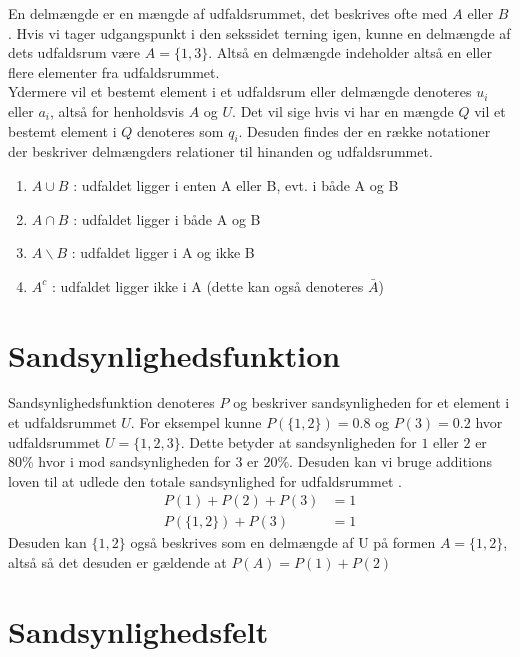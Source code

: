 \documentclass[../../SRP.tex]{subfiles}
\begin{document}
En delmængde er en mængde af udfaldsrummet, det beskrives ofte med $A$ eller $B$. Hvis vi tager udgangspunkt i den sekssidet terning igen, kunne en delmængde af dets udfaldsrum være $A = \{1,3\}$. Altså en delmængde indeholder altså en eller flere elementer fra udfaldsrummet. \\

Ydermere vil et bestemt element i et udfaldsrum eller delmængde denoteres $u_i$ eller $a_i$, altså for henholdsvis $A$ og $U$. Det vil sige hvis vi har en mængde $Q$ vil et bestemt element i $Q$ denoteres som $q_i$. Desuden findes der en række notationer der beskriver delmængders relationer til hinanden og udfaldsrummet.
\begin{enumerate}
  \item $A \cup B$ : udfaldet ligger i enten A eller B, evt. i både A og B
  \item $A \cap B$ : udfaldet ligger i både A og B
  \item $A \backslash B$ : udfaldet ligger i A og ikke B
  \item $A^c$ : udfaldet ligger ikke i A (dette kan også denoteres $\bar{A}$)
\end{enumerate}

\section{Sandsynlighedsfunktion}

Sandsynlighedsfunktion denoteres $P$ og beskriver sandsynligheden for et element i et udfaldsrummet $U$. For eksempel kunne $P(\{1,2\}) = 0.8$ og $P(3) = 0.2$ hvor udfaldsrummet $U = \{1,2,3\}$. Dette betyder at sandsynligheden for $1$ eller $2$ er $80\%$ hvor i mod sandsynligheden for $3$ er $20\%$. Desuden kan vi bruge additions loven til at udlede den totale sandsynlighed for udfaldsrummet \cite{SC}.
\begin{align}
  P(1) + P(2) + P(3) &= 1 \\
  P(\{1,2\}) + P(3) &= 1
\end{align}
Desuden kan $\{1,2\}$ også beskrives som en delmængde af U på formen $A = \{1,2\}$, altså så det desuden er gældende at $P(A) = P(1) + P(2)$

\section{Sandsynlighedsfelt}
\end{document}
